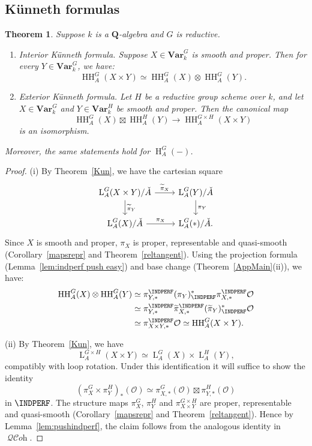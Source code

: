 \documentclass[12pt, oneside]{amsart}
\numberwithin{equation}{section}
\newtheorem{theorem}[subsubsection]{Theorem}
\theoremstyle{remark}
\theoremstyle{plain}
\DeclareMathOperator{\QCOH}{\mathcal{QC}\textit{oh}}
\newcommand{\Loop}{\operatorname{L}}
\newcommand{\OO}{\mathcal{O}}
\newcommand{\bQ}{\mathbf{Q}}
\newcommand{\Var}{\mathbf{Var}_{k}}
\newcommand{\HH}{\operatorname{HH}}
\newcommand{\Hcoh}{\operatorname{H}}
\begin{document}
\subsection{K\"unneth formulas}\label{ssec:coh Kunneth}

\begin{theorem}\label{thm:H Kun}
Suppose $k$ is a $\bQ$-algebra and $G$ is reductive.
\begin{enumerate}
\item \label{item:IntKun} \emph{Interior K\"unneth formula}.
Suppose $X \in \Var^G$ is smooth and proper.
Then for every $Y \in \Var^G$, we have:
$$\HH_A^G(X\times Y)\simeq \HH_A^G(X) \otimes \HH_A^G(Y).$$

\item \label{item:ExtKun} \emph{Exterior K\"unneth formula}.
Let $H$ be a reductive group scheme over $k$, and let $X \in \Var^G$ and $Y \in \Var^H$ be smooth and proper.
Then the canonical map
\[
  \HH_A^G(X)\boxtimes\HH_A^H(Y) \longrightarrow \HH_A^{G\times H}(X\times Y)
\]
is an isomorphism.
\end{enumerate}
Moreover, the same statements hold for $\Hcoh_A^G(-)$.
\end{theorem}

\begin{proof}(i) By Theorem~\ref{Kun}, we have the cartesian square
$$\begin{tikzcd}
\Loop_A^G(X\times Y)/\check{A}
  \arrow{r}{\widetilde{\pi}_X}
  \arrow{d}{\widetilde{\pi}_Y}
  & \Loop^G_A(Y)/\check{A}\arrow{d}{\pi_Y} \\
\Loop^G_A(X)/\check{A}\arrow{r}{\pi_X}
  & \Loop^G_A(*)/\check{A}.
\end{tikzcd}$$
Since $X$ is smooth and proper, $\pi_X$ is proper, representable and quasi-smooth (Corollary~\ref{mapsrepr} and Theorem~\ref{reltangent}).
Using the projection formula (Lemma~\ref{lem:indperf push easy}) and base change (Theorem~\ref{AppMain}(ii)), we have:
\begin{align*}
\HH_A^G(X)\otimes\HH_A^G(Y)
&\simeq \pi_{Y,*}^{\INDPERF}(\pi_Y)^*_{\INDPERF}\pi_{X,*}^{\INDPERF}\OO \\
&\simeq \pi_{Y,*}^{\INDPERF}\widetilde{\pi}_{X,*}^{\INDPERF}(\widetilde{\pi}_Y)^*_{\INDPERF}\OO \\
&\simeq \pi_{X\times Y,*}^{\INDPERF}\OO
\simeq \HH_A^G(X\times Y).
\end{align*}

(ii) By Theorem~\ref{Kun}, we have
$$\Loop_A^{G\times H}(X\times Y) \simeq \Loop_A^G(X)\times\Loop_A^H(Y),$$
compatibly with loop rotation.
Under this identification it will suffice to show the identity
\[
  (\pi_X^G \times \pi_Y^H)_*(\OO) \simeq \pi_{X,*}^G(\OO) \boxtimes \pi_{Y,*}^H(\OO)
\]
in $\INDPERF$.
The structure maps $\pi_X^G$, $\pi_Y^H$ and $\pi_{X\times Y}^{G \times H}$ are proper, representable and quasi-smooth (Corollary~\ref{mapsrepr} and Theorem~\ref{reltangent}).
Hence by Lemma~\ref{lem:pushindperf}, the claim follows from the analogous identity in $\QCOH$.
\end{proof}
\end{document}
